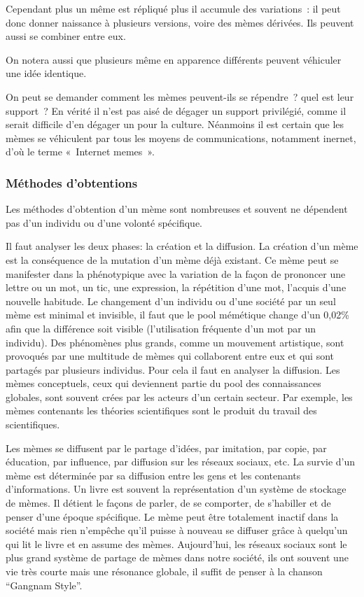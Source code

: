 \documentclass[12pt]{article}
\begin{document}
Cependant plus un même est répliqué plus il accumule des variations~: il
peut donc donner naissance à plusieurs versions, voire des mèmes
dérivées. Ils peuvent aussi se combiner entre eux.

On notera aussi que plusieurs même en apparence différents peuvent
véhiculer une idée identique.

On peut se demander comment les mèmes peuvent-ils se répendre~? quel est
leur support~? En vérité il n'est pas aisé de dégager un support
privilégié, comme il serait difficile d'en dégager un pour la culture.
Néanmoins il est certain que les mèmes se véhiculent par tous les moyens
de communications, notamment inernet, d'où le terme «~Internet memes~».\cite{chronique}


\subsubsection{Méthodes d'obtentions}

Les méthodes d'obtention d'un mème sont nombreuses et souvent ne
dépendent pas d'un individu ou d'une volonté spécifique.

Il faut analyser les deux phases: la création et la diffusion. La
création d'un mème est la conséquence de la mutation d'un mème déjà
existant. Ce mème peut se manifester dans la phénotypique avec la
variation de la façon de prononcer une lettre ou un mot, un tic, une
expression, la répétition d'une mot, l'acquis d'une nouvelle habitude. \cite{origine}
Le changement d'un individu ou d'une société par un seul mème est
minimal et invisible, il faut que le pool mémétique change d'un 0,02\%
afin que la différence soit visible (l'utilisation fréquente d'un mot
par un individu). Des phénomènes plus grands, comme un mouvement
artistique, sont provoqués par une multitude de mèmes qui collaborent
entre eux et qui sont partagés par plusieurs individus. Pour cela il
faut en analyser la diffusion. Les mèmes conceptuels, ceux qui
deviennent partie du pool des connaissances globales, sont souvent crées
par les acteurs d'un certain secteur. Par exemple, les mèmes contenants
les théories scientifiques sont le produit du travail des scientifiques.

Les mèmes se diffusent par le partage d'idées, par imitation, par copie,
par éducation, par influence, par diffusion sur les réseaux sociaux,
etc. La survie d'un mème est déterminée par sa diffusion entre les gens
et les contenants d'informations. Un livre est souvent la représentation
d'un système de stockage de mèmes. Il détient le façons de parler, de se
comporter, de s'habiller et de penser d'une époque spécifique. Le mème
peut être totalement inactif dans la société mais rien n'empêche qu'il
puisse à nouveau se diffuser grâce à quelqu'un qui lit le livre et en
assume des mèmes. Aujourd'hui, les réseaux sociaux sont le plus grand
système de partage de mèmes dans notre société, ils ont souvent une vie
très courte mais une résonance globale, il suffit de penser à la chanson
``Gangnam Style''.
\end{document}
